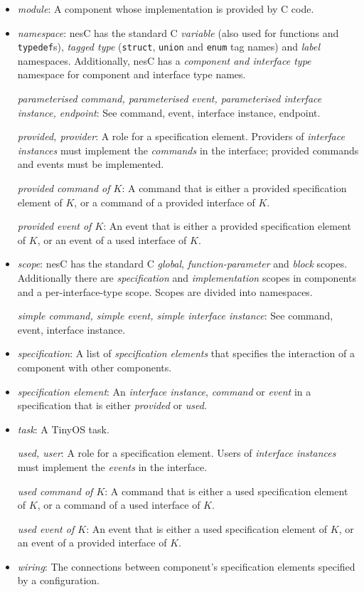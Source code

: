 \documentclass[11pt]{article}
\newcommand{\code}[1]{{\tt #1}}
\newcommand{\nesc}{nesC\xspace}
\begin{document}
\begin{itemize}
\item \emph{module}: A component whose implementation is provided by C
code. 

\item \emph{namespace}: \nesc has the standard C \emph{variable} (also
used for functions and \code{typedef}s), \emph{tagged type} (\code{struct},
\code{union} and \code{enum} tag names) and \emph{label}
namespaces. Additionally, \nesc has a \emph{component and interface type}
namespace for component and interface type names.

\emph{parameterised command, parameterised event, parameterised interface
instance, endpoint}: See command, event, interface instance, endpoint.

\emph{provided, provider}: A role for a specification element. Providers of
\emph{interface instances} must implement the \emph{commands} in the
interface; provided commands and events must be implemented.

\emph{provided command of $K$}: A command that is either a
provided specification element of $K$, or a command of a provided interface
of $K$.

\emph{provided event of $K$}: An event that is either a
provided specification element of $K$, or an event of a used interface
of $K$.

\item \emph{scope}: \nesc has the standard C \emph{global},
\emph{function-parameter} and \emph{block} scopes. Additionally there are
\emph{specification} and \emph{implementation} scopes in components and a
per-interface-type scope. Scopes are divided into namespaces.

\emph{simple command, simple event, simple interface instance}: See
command, event, interface instance.

\item \emph{specification}: A list of \emph{specification elements} that
specifies the interaction of a component with other components.

\item \emph{specification element}: An \emph{interface instance},
\emph{command} or \emph{event} in a specification that is either 
\emph{provided} or \emph{used}.

\item \emph{task}: A TinyOS task.

\emph{used, user}: A role for a specification element. Users of
\emph{interface instances} must implement the \emph{events} in the
interface.

\emph{used command of $K$}: A command that is either a used specification
element of $K$, or a command of a used interface of $K$.

\emph{used event of $K$}: An event that is either a used specification
element of $K$, or an event of a provided interface of $K$.

\item \emph{wiring}: The connections between component's specification
elements specified by a configuration.

\end{itemize}




\end{document}
